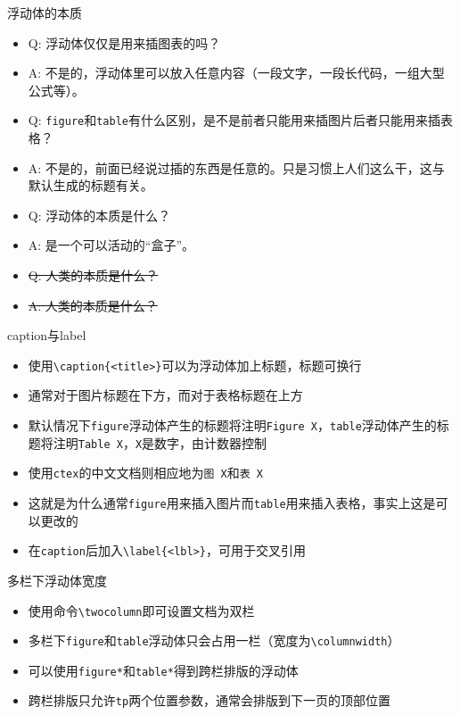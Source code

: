 \begin{frame}{浮动体的本质}
	\begin{itemize}
		\item Q: 浮动体仅仅是用来插图表的吗？
		\item A: 不是的，浮动体里可以放入任意内容（一段文字，一段长代码，一组大型公式等）。
		\item Q: \texttt{figure}和\texttt{table}有什么区别，是不是前者只能用来插图片后者只能用来插表格？
		\item A: 不是的，前面已经说过插的东西是任意的。只是习惯上人们这么干，这与默认生成的标题有关。
		\item Q: 浮动体的本质是什么？
		\item A: 是一个可以活动的“盒子”。
		\item \sout{Q: 人类的本质是什么？}
		\item \sout{A: 人类的本质是什么？}
	\end{itemize}
\end{frame}
\begin{frame}[fragile]{caption与label}
	\begin{itemize}
		\item 使用\verb|\caption{<title>}|可以为浮动体加上标题，标题可换行
		\item 通常对于图片标题在下方，而对于表格标题在上方
		\item 默认情况下\texttt{figure}浮动体产生的标题将注明\texttt{Figure X}，\texttt{table}浮动体产生的标题将注明\texttt{Table X}，\texttt{X}是数字，由计数器控制
		\item 使用\texttt{ctex}的中文文档则相应地为\texttt{图 X}和\texttt{表 X}
		\item 这就是为什么通常\texttt{figure}用来插入图片而\texttt{table}用来插入表格，事实上这是可以更改的
		\item 在\texttt{caption}后加入\verb|\label{<lbl>}|，可用于交叉引用
	\end{itemize}
\end{frame}
\begin{frame}[fragile]{多栏下浮动体宽度}
	\begin{itemize}
		\item 使用命令\verb|\twocolumn|即可设置文档为双栏
		\item 多栏下\texttt{figure}和\texttt{table}浮动体只会占用一栏（宽度为\verb|\columnwidth|）
		\item 可以使用\texttt{figure*}和\texttt{table*}得到跨栏排版的浮动体
		\item 跨栏排版只允许\texttt{tp}两个位置参数，通常会排版到下一页的顶部位置
	\end{itemize}
\end{frame}
